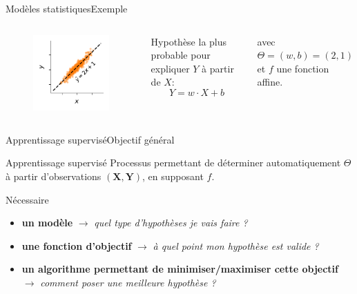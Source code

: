 \documentclass[12pt,dvipsnames,aspectratio=169]{beamer}
\newcommand{\X}[0]{\mathbf{X}}
\newcommand{\Y}[0]{\mathbf{Y}}
\begin{document}
\begin{frame}{Modèles statistiques}{Exemple}
    \begin{columns}
        \begin{figure}
            \centering
            \includegraphics[width=\textwidth]{figures/linear_explained.pdf}
        \end{figure}
        Hypothèse la plus probable pour expliquer $Y$ à partir de $X$: 
        $$Y = w \cdot X + b$$\par
        avec $\Theta = (w, b) = (2, 1)$ et $f$ une fonction affine.
    \end{columns}
\end{frame}

\begin{frame}{Apprentissage supervisé}{Objectif général}
    \begin{block}{Apprentissage supervisé}
        Processus permettant de déterminer automatiquement $\Theta$ à partir d'observations $(\X, \Y)$, en supposant $f$.
    \end{block}

    \begin{block}{Nécessaire}
        \begin{itemize}
            \item \textbf{un modèle} $\rightarrow$ \textit{quel type d'hypothèses je vais faire ?}
            \item \textbf{une fonction d'objectif} $\rightarrow$ \textit{à quel point mon hypothèse est valide ?}
            \item \textbf{un algorithme permettant de minimiser/maximiser cette objectif} $\rightarrow$ \textit{comment poser une meilleure hypothèse ?}
        \end{itemize}
    \end{block}
\end{frame}
\end{document}
